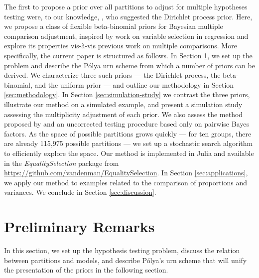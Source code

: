 \documentclass[11pt,a4paper]{article}
\theoremstyle{definition} %
\theoremstyle{case}
\begin{document}
The first to propose a prior over all partitions to adjust for multiple hypotheses testing were, to our knowledge, \textcite{gopalan1998bayesian}, who suggested the Dirichlet process prior. Here, we propose a class of flexible beta-binomial priors for Bayesian multiple comparison adjustment, inspired by work on variable selection in regression \parencite{scott2006exploration, scott2010bayes} and explore its properties vis-à-vis previous work on multiple comparisons. More specifically, the current paper is structured as follows. In Section \ref{sec:setup}, we set up the problem and describe the P\'{o}lya urn scheme from which a number of priors can be derived. We characterize three such priors --- the Dirichlet process, the beta-binomial, and the uniform prior --- and outline our methodology in Section \ref{sec:methodology}. In Section \ref{sec:simulation-study} we contrast the three priors, illustrate our method on a simulated example, and present a simulation study assessing the multiplicity adjustment of each prior. We also assess the method proposed by \textcite{westfall1997bayesian} and an uncorrected testing procedure based only on pairwise Bayes factors. As the space of possible partitions grows quickly --- for ten groups, there are already 115,975 possible partitions --- we set up a stochastic search algorithm to efficiently explore the space. Our method is implemented in Julia and available in the \textit{EqualitySelection} package from \url{https://github.com/vandenman/EqualitySelection}. In Section \ref{sec:applications}, we apply our method to examples related to the comparison of proportions and variances. We conclude in Section \ref{sec:discussion}.




\section{Preliminary Remarks} \label{sec:setup}
In this section, we set up the hypothesis testing problem, discuss the relation between partitions and models, and describe P\'{o}lya's urn scheme that will unify the presentation of the priors in the following section.
\end{document}
